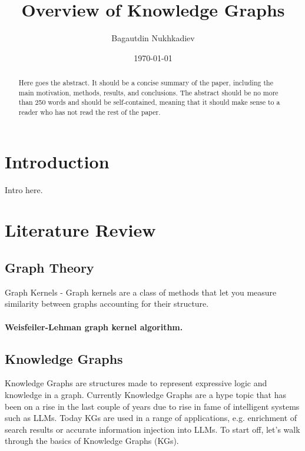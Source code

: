 \documentclass[a4paper,oneside,bibliography=totoc]{scrartcl}
\begin{document}
\subject{Personal Survey} %
\title{Overview of Knowledge Graphs}
\author{Bagautdin Nukhkadiev}
\date{\today}
\maketitle

\begin{abstract}

Here goes the abstract. It should be a concise summary of the paper, including the main motivation, methods, results, and conclusions. 
The abstract should be no more than 250 words and should be self-contained, meaning that it should make sense to a reader who has not read the rest of the paper.

\end{abstract}

\section{Introduction}
\label{ch:intro}

Intro here. 


\section{Literature Review}
\label{sec:related_work}

\subsection{Graph Theory}
Graph Kernels - Graph kernels are a class of methods that let you measure similarity 
between graphs accounting for their structure.

\paragraph{Weisfeiler-Lehman graph kernel algorithm.} 


\subsection{Knowledge Graphs}

Knowledge Graphs are structures made to represent expressive logic and knowledge in a graph. 
Currently Knowledge Graphs are a hype topic that has been on a rise in the last couple of years due to rise in fame of intelligent systems such as LLMs.
Today KGs are used in a range of applications, e.g. enrichment of search results or accurate information injection into LLMs.
To start off, let's walk through the basics of Knowledge Graphs (KGs). 
\end{document}
